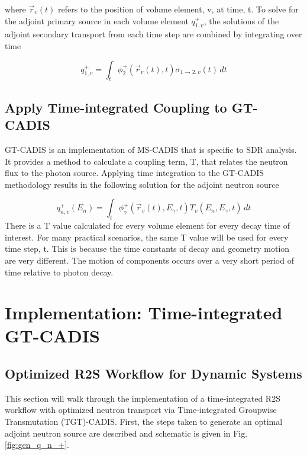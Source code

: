 where $\overrightarrow{r}_{v}(t)$ refers to the position of volume element, v,
at time, t.  To solve for the adjoint primary source in each volume element
$q_{1,v}^{+}$, the solutions of the 
adjoint secondary transport from each time step are combined by
integrating over time

 \begin{equation}\label{eq:adj_src_1_avg}
	 q_{1,v}^{+} =
	 \int_{t}  \phi_{2}^{+}(\overrightarrow{r}_{v}(t), t)
	 \sigma_{1\rightarrow 2,v}(t)\, dt
 \end{equation}

 
\subsection{Apply Time-integrated Coupling to GT-CADIS}

GT-CADIS is an implementation of MS-CADIS that is specific to SDR analysis.  It
provides a method to calculate a coupling term, T, that relates the neutron
flux to the photon source.
Applying time integration to the GT-CADIS methodology results in the following
solution for the adjoint neutron source

 \begin{equation}\label{eq:adj_src_1_avg}
	 q_{n,v}^{+}(E_{n}) =
	 \int_{t}     \phi_{\gamma}^{+}(\overrightarrow{r}_{v}(t), E_{\gamma},t)
	 T_{v}(E_n, E_{\gamma}, t)\, dt
 \end{equation}
 There is a T value calculated for every volume element for every decay time of
 interest.  For many practical scenarios, the same T value will be used for
 every time step, t.  This is because the time constants of decay and geometry
 motion are very different.  The motion of components occurs over a very short
 period of time relative to photon decay.  


\section{Implementation: Time-integrated GT-CADIS}\label{sec:implementation}

\subsection{Optimized R2S Workflow for Dynamic Systems}
This section will walk through the implementation of a
time-integrated R2S workflow with optimized neutron transport via
Time-integrated Groupwise Transmutation (TGT)-CADIS. 
First, the steps taken to generate an optimal adjoint neutron source are
described and schematic is given in Fig. \ref{fig:gen_q_n_+}.

